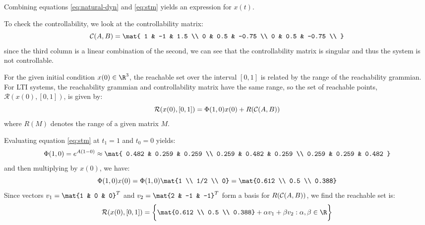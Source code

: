 \documentclass{homework}
\begin{document}
\begin{letterenum}
Combining equations \ref{eq:natural-dyn} and \ref{eq:stm} yields an expression for $x(t)$.

\item To check the controllability, we look at the controllability matrix:
\begin{equation*}
    \control(A, B) = \mat{
        1 & -1 & 1.5 \\
        0 & 0.5 & -0.75 \\
        0 & 0.5 & -0.75 \\
    }
\end{equation*}
since the third column is a linear combination of the second, we can see that the controllability
matrix is singular and thus the system is not controllable.

For the given initial condition $x(0)\in\R^3$, the reachable set over the interval
$[0, 1]$ is related by the range
of the reachability grammian.
For LTI systems, the reachability grammian and controllability matrix have the same range, so
the set of reachable points, $\mathcal{R}(x(0), [0, 1])$, is given by:
\begin{equation*}
    \mathcal{R}(x(0), [0, 1]) = \Phi(1, 0)x(0) + R(\mathcal{C}(A, B))
\end{equation*}
where $R(M)$ denotes the range of a given matrix $M$.

Evaluating equation \ref{eq:stm} at $t_1=1$ and $t_0=0$ yields:
\begin{equation*}
    \Phi(1, 0) = e^{A(1 - 0)} \approx \mat{
        0.482 & 0.259 & 0.259 \\
        0.259 & 0.482 & 0.259 \\
        0.259 & 0.259 & 0.482
    }
\end{equation*}
and then multiplying by $x(0)$, we have:
\begin{equation*}
    \Phi(1, 0) x(0) = \Phi(1, 0) \mat{1 \\ 1/2 \\ 0} = \mat{0.612 \\ 0.5 \\ 0.388}
\end{equation*}
Since vectors $v_1 = \mat{1 & 0 & 0}^T$ and $v_2 = \mat{2 & -1 & -1}^T$ form a basis for
$R(\mathcal{C}(A, B))$, we find the reachable set is:
\begin{equation*}
    \mathcal{R}(x(0), [0, 1]) = \biggl\{
        \mat{0.612 \\ 0.5 \\ 0.388} + \alpha v_1 + \beta v_2: \alpha,\beta\in\R
    \biggr\}
\end{equation*}


\end{letterenum}
\end{document}
